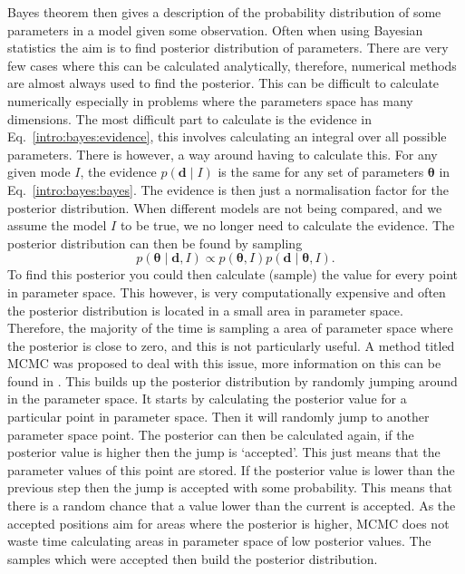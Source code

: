 Bayes theorem then gives a description of the probability distribution of some parameters in a model given some observation.
Often when using Bayesian statistics the aim is to find posterior distribution of parameters.
There are very few cases where this can be calculated analytically, therefore, numerical methods are almost always used to find the posterior.
This can be difficult to calculate numerically especially in problems where the parameters space has many dimensions.
The most difficult part to calculate is the evidence in Eq.~\ref{intro:bayes:evidence}, this involves calculating an integral over all possible parameters.
There is however, a way around having to calculate this. For any given mode $I$, the evidence $p({\bm d}\mid I)$ is the same for any set of parameters ${\bm \theta}$ in Eq.~\ref{intro:bayes:bayes}. 
The evidence is then just a normalisation factor for the posterior distribution. 
When different models are not being compared, and we assume the model $I$ to be true, we no longer need to calculate the evidence.
The posterior distribution can then be found by sampling
\begin{equation}
p({\bm \theta} \mid {\bm d}, I) \propto p({\bm \theta}, I)p({\bm d} \mid {\bm \theta}, I).
\end{equation}
To find this posterior you could then calculate (sample) the value for every point in parameter space. This however, is very computationally expensive and often the posterior distribution is located in a small area in parameter space. 
Therefore, the majority of the time is sampling a area of parameter space where the posterior is close to zero, and this is not particularly useful. 
A method titled \gls{MCMC} was proposed \citep{metropolis1953EquationState} to deal with this issue, more information on this can be found in \citep{vanravenzwaaij2018SimpleIntroduction,sharma2017MarkovChain}.
This builds up the posterior distribution by randomly jumping around in the parameter space.
It starts by calculating the posterior value for a particular point in parameter space. Then it will randomly jump to another parameter space point. 
The posterior can then be calculated again, if the posterior value is higher then the jump is `accepted'. This just means that the parameter values of this point are stored.
If the posterior value is lower than the previous step then the jump is accepted with some probability. This means that there is a random chance that a value lower than the current is accepted.
As the accepted positions aim for areas where the posterior is higher, \gls{MCMC} does not waste time calculating areas in parameter space of low posterior values.
The samples which were accepted then build the posterior distribution. 


